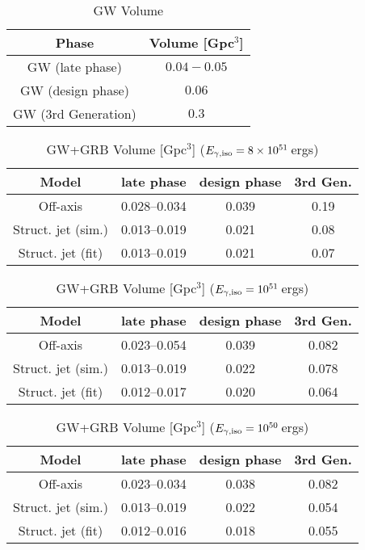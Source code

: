 
\begin{table}
	\centering
	\caption{\label{ResultsVolumeGW} GW Volume}
	\begin{tabular}{|c|c|}
		\hline
		Phase               & Volume [Gpc$^3$] \\ \hline
		GW (late phase)     & $0.04-0.05$      \\ \hline
		GW (design phase)   & $0.06$           \\ \hline
		GW (3rd Generation) & $0.3$            \\ \hline
	\end{tabular}
\end{table}



\begin{table}
	\centering
	\caption{\label{ResultsVolumeGWRB8e51} GW+GRB Volume [Gpc$^{3}$] ($E_{\rm \gamma,iso}=8\times 10^{51}$\,ergs)}
	\begin{tabular}{|c|c|c|c|}
		\hline
		Model              & late phase   & design phase & 3rd Gen. \\ \hline
		Off-axis           & 0.028--0.034 & 0.039        & 0.19     \\ \hline
		Struct. jet (sim.) & 0.013--0.019 & 0.021        & 0.08     \\ \hline
		Struct. jet (fit)  & 0.013--0.019 & 0.021        & 0.07     \\ \hline
	\end{tabular}
\end{table}

\begin{table}
	\centering
	\caption{\label{ResultsVolumeGWRB1e51} GW+GRB Volume [Gpc$^{3}$] ($E_{\rm \gamma,iso}=10^{51}$\,ergs)}
	\begin{tabular}{|c|c|c|c|}
		\hline
		Model              & late phase   & design phase & 3rd Gen. \\ \hline
		Off-axis           & 0.023--0.054 & 0.039        & 0.082    \\ \hline
		Struct. jet (sim.) & 0.013--0.019 & 0.022        & 0.078    \\ \hline
		Struct. jet (fit)  & 0.012--0.017 & 0.020        & 0.064    \\ \hline
	\end{tabular}
\end{table}

\begin{table}
	\centering
	\caption{\label{ResultsVolumeGWRB1e50} GW+GRB Volume [Gpc$^{3}$] ($E_{\rm \gamma,iso}=10^{50}$\,ergs)}
	\begin{tabular}{|c|c|c|c|}
		\hline
		Model              & late phase   & design phase & 3rd Gen. \\ \hline
		Off-axis           & 0.023--0.034 & 0.038        & 0.082    \\ \hline
		Struct. jet (sim.) & 0.013--0.019 & 0.022        & 0.054    \\ \hline
		Struct. jet (fit)  & 0.012--0.016 & 0.018        & 0.055    \\ \hline
	\end{tabular}
\end{table}

